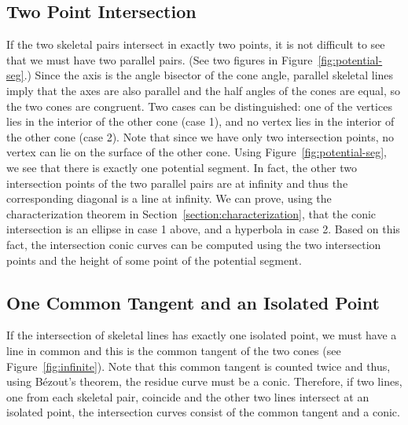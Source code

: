 
\subsection{Two Point Intersection}
\label{section:two-point}
     If the two skeletal pairs intersect in exactly two points, it is not
difficult to see that we must have two parallel pairs. (See two figures in
Figure~\ref{fig:potential-seg}.)  Since the axis is the
angle bisector of the cone angle, parallel skeletal lines imply that the axes
are also parallel and the half angles of the cones are equal, 
so the two cones are congruent.
Two cases can be distinguished: one of the vertices lies 
in the interior of the other cone (case 1), 
and no vertex lies in the interior of the other cone (case 2).  Note that 
since we have only two intersection points, no vertex can lie on the surface of
the other cone.  Using Figure~\ref{fig:potential-seg}, 
we see that there is exactly one potential segment.
In fact, the other two intersection points of the two parallel pairs are at 
infinity and thus the corresponding diagonal is a line at infinity.  We can 
prove, using the characterization theorem in 
Section~\ref{section:characterization}, that the conic intersection is an 
ellipse in case 1 above, and a hyperbola in case 2.  Based on
this fact, the  intersection conic curves can be computed using the two 
intersection points and the height of some point of the potential segment.  


\subsection{One Common Tangent and an Isolated Point}
\label{section:one-coincide-line}
     If the intersection of skeletal lines has exactly one isolated point, we
must have a line in common and this is the common tangent of the two cones
(see Figure~\ref{fig:infinite}).  Note that this common tangent is counted 
twice and thus, using B\'{e}zout's
theorem, the residue curve must be a conic.  Therefore, if two lines, one from
each skeletal pair, coincide and the other two lines intersect at an isolated 
point, the intersection curves consist of the common tangent and a conic.

